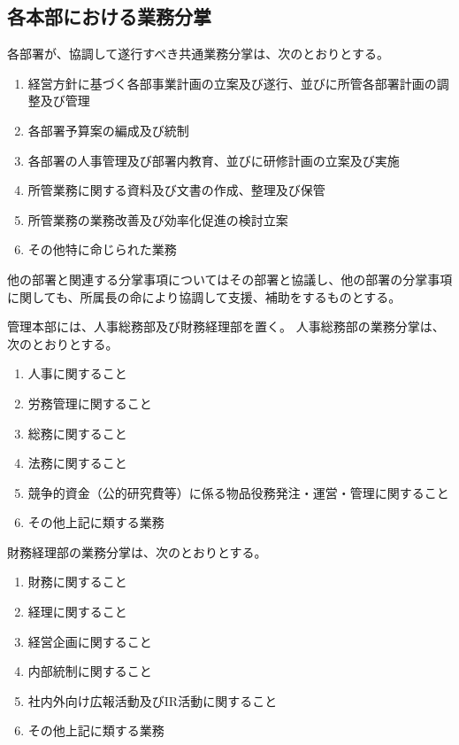 \documentclass[10pt,a4paper,uplatex,dvipdfmx]{jsarticle}
\begin{document}
\subsection{各本部における業務分掌}
各部署が、協調して遂行すべき共通業務分掌は、次のとおりとする。
\begin{enumerate}
	\item 経営方針に基づく各部事業計画の立案及び遂行、並びに所管各部署計画の調整及び管理
	\item 各部署予算案の編成及び統制
	\item 各部署の人事管理及び部署内教育、並びに研修計画の立案及び実施
	\item 所管業務に関する資料及び文書の作成、整理及び保管
	\item 所管業務の業務改善及び効率化促進の検討立案
	\item その他特に命じられた業務
\end{enumerate}
\term 他の部署と関連する分掌事項についてはその部署と協議し、他の部署の分掌事項に関しても、所属長の命により協調して支援、補助をするものとする。

管理本部には、人事総務部及び財務経理部を置く。
\term 人事総務部の業務分掌は、次のとおりとする。
\begin{enumerate}
	\item 人事に関すること
	\item 労務管理に関すること
	\item 総務に関すること
	\item 法務に関すること
	\item 競争的資金（公的研究費等）に係る物品役務発注・運営・管理に関すること
	\item その他上記に類する業務    
\end{enumerate}

\term 財務経理部の業務分掌は、次のとおりとする。
\begin{enumerate}
	\item 財務に関すること
	\item 経理に関すること
	\item 経営企画に関すること
	\item 内部統制に関すること
	\item 社内外向け広報活動及びIR活動に関すること
	\item その他上記に類する業務
\end{enumerate}
\end{document}
